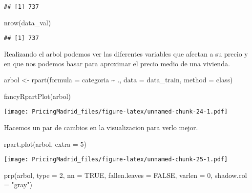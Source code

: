 \documentclass[
]{article}
\newenvironment{Shaded}{\begin{snugshade}}{\end{snugshade}}
\newcommand{\AttributeTok}[1]{\textcolor[rgb]{0.77,0.63,0.00}{#1}}
\newcommand{\ConstantTok}[1]{\textcolor[rgb]{0.00,0.00,0.00}{#1}}
\newcommand{\DecValTok}[1]{\textcolor[rgb]{0.00,0.00,0.81}{#1}}
\newcommand{\FunctionTok}[1]{\textcolor[rgb]{0.00,0.00,0.00}{#1}}
\newcommand{\NormalTok}[1]{#1}
\newcommand{\OtherTok}[1]{\textcolor[rgb]{0.56,0.35,0.01}{#1}}
\newcommand{\SpecialCharTok}[1]{\textcolor[rgb]{0.00,0.00,0.00}{#1}}
\newcommand{\StringTok}[1]{\textcolor[rgb]{0.31,0.60,0.02}{#1}}
\begin{document}
\begin{verbatim}
## [1] 737
\end{verbatim}

\begin{Shaded}
\begin{Highlighting}[]
\FunctionTok{nrow}\NormalTok{(data\_val)}
\end{Highlighting}
\end{Shaded}

\begin{verbatim}
## [1] 737
\end{verbatim}

Realizando el arbol podemos ver las diferentes variables que afectan a
su precio y en que nos podemos basar para aproximar el precio medio de
una vivienda.

\begin{Shaded}
\begin{Highlighting}[]
\NormalTok{arbol }\OtherTok{\textless{}{-}} \FunctionTok{rpart}\NormalTok{(}\AttributeTok{formula =}\NormalTok{  categoria  }\SpecialCharTok{\textasciitilde{}}\NormalTok{ ., }\AttributeTok{data =}\NormalTok{ data\_train, }\AttributeTok{method =} \StringTok{\textquotesingle{}class\textquotesingle{}}\NormalTok{)}

\FunctionTok{fancyRpartPlot}\NormalTok{(arbol)}
\end{Highlighting}
\end{Shaded}

\texttt{[image: PricingMadrid\_files/figure-latex/unnamed-chunk-24-1.pdf]}

Hacemos un par de cambios en la visualizacion para verlo mejor.

\begin{Shaded}
\begin{Highlighting}[]
\FunctionTok{rpart.plot}\NormalTok{(arbol, }\AttributeTok{extra =} \DecValTok{5}\NormalTok{)}
\end{Highlighting}
\end{Shaded}

\texttt{[image: PricingMadrid\_files/figure-latex/unnamed-chunk-25-1.pdf]}

\begin{Shaded}
\begin{Highlighting}[]
\FunctionTok{prp}\NormalTok{(arbol, }\AttributeTok{type =} \DecValTok{2}\NormalTok{, }\AttributeTok{nn =} \ConstantTok{TRUE}\NormalTok{, }
    \AttributeTok{fallen.leaves =} \ConstantTok{FALSE}\NormalTok{,}
    \AttributeTok{varlen =} \DecValTok{0}\NormalTok{,  }\AttributeTok{shadow.col =} \StringTok{"gray"}\NormalTok{)}
\end{Highlighting}
\end{Shaded}
\end{document}

